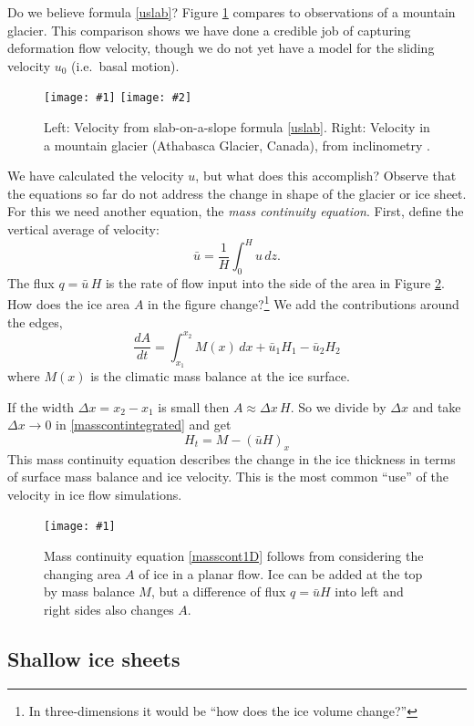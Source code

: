 \documentclass[letterpaper,final,12pt,reqno]{amsart}
\newcommand{\onefigsize}[3]{
\begin{figure}[ht]
\centering
\texttt{[image: \#1]}
\caption{#2}
\label{fig:#1}
\end{figure}}
\newcommand{\twofigsizes}[5]{
\begin{figure}[ht]
\centering
\texttt{[image: \#1]} \quad
\texttt{[image: \#2]}
\caption{#3}
\label{fig:#1}
\end{figure}}
\begin{document}
Do we believe formula \eqref{uslab}?  Figure \ref{fig:slabvel} compares to observations of a mountain glacier.  This comparison shows we have done a credible job of capturing deformation flow velocity, though we do not yet have a model for the sliding velocity $u_0$ (i.e.~basal motion).  

\twofigsizes{slabvel}{athabasca_deform}{Left:  Velocity from slab-on-a-slope formula \eqref{uslab}.  Right:  Velocity in a mountain glacier (Athabasca Glacier, Canada), from inclinometry \cite{SavagePaterson}.}{2.0in}{1.8in}

We have calculated the velocity $u$, but what does this accomplish?  Observe that the equations so far do not address the change in shape of the glacier or ice sheet.  For this we need another equation, the \emph{mass continuity equation}.  First, define the vertical average of velocity:
	$$\bar u = \frac{1}{H}\int_0^{H} u\,dz.$$
The flux $q=\bar u\, H$ is the rate of flow input into the side of the area in Figure \ref{fig:slabmasscontfig}.  How does the ice area $A$ in the figure change?\footnote{In three-dimensions it would be ``how does the ice volume change?''}  We add the contributions around the edges,
\begin{equation}
\frac{dA}{dt} = \int_{x_1}^{x_2} M(x)\,dx + \bar u_1 H_1 - \bar u_2 H_2 \label{masscontintegrated}
\end{equation}
where $M(x)$ is the climatic mass balance at the ice surface.

If the width $\Delta x=x_2-x_1$ is small then $A\approx \Delta x\, H$.  So we divide by $\Delta x$ and take $\Delta x \to 0$ in \eqref{masscontintegrated} and get
\begin{equation}
H_t = M - \left(\bar u H\right)_x \label{masscont1D}
\end{equation}
This mass continuity equation describes the change in the ice thickness in terms of surface mass balance and ice velocity.  This is the most common ``use'' of the velocity in ice flow simulations.

\onefigsize{slabmasscontfig}{Mass continuity equation \eqref{masscont1D} follows from considering the changing area $A$ of ice in a planar flow.  Ice can be added at the top by mass balance $M$, but a difference of flux $q=\bar u H$ into left and right sides also changes $A$.}{2.5in}


\subsection{Shallow ice sheets}
\end{document}
